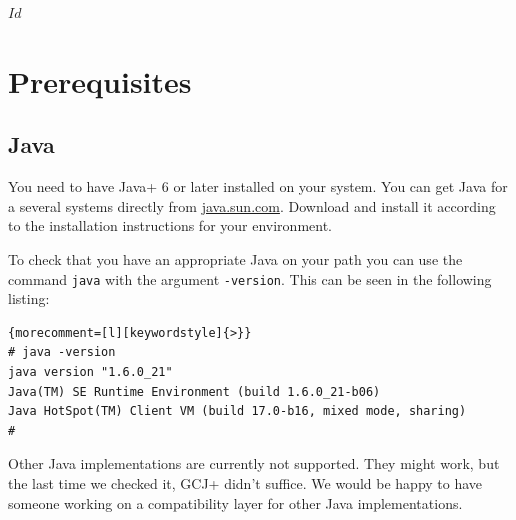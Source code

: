 \SVN$Id$
\chapter{Prerequisites}

\section{Java}

You need to have \+Java+ 6 or later installed on your system. You can
get Java for a several systems directly from \url{java.sun.com}.
Download and install it according to the installation instructions for
your environment.

To check that you have an appropriate Java on your path you can use
the command \texttt{java} with the argument \texttt{-version}. This
can be seen in the following listing:

%
\begin{lstlisting}{morecomment=[l][keywordstyle]{>}}
# java -version
java version "1.6.0_21"
Java(TM) SE Runtime Environment (build 1.6.0_21-b06)
Java HotSpot(TM) Client VM (build 17.0-b16, mixed mode, sharing)
#
\end{lstlisting}

Other Java implementations are currently not supported. They might
work, but the last time we checked it, \+GCJ+ didn't suffice. We would
be happy to have someone working on a compatibility layer for other
Java implementations.


